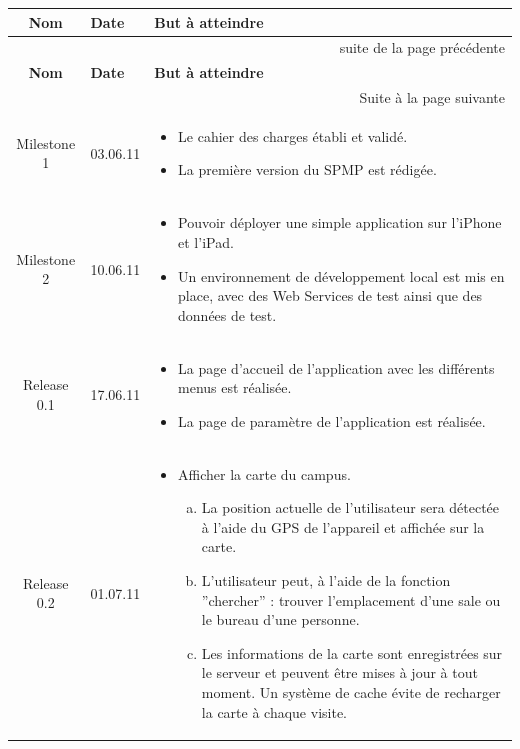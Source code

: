 \begin{longtable}{|c|l|p{10cm}|}
		 \hline  \textbf{Nom} & \textbf{Date}  & \textbf{But à atteindre}  \\ 
		 \endfirsthead
		  \multicolumn{3}{|r|}{{suite de la page précédente}} \\ \hline
		\hline  \textbf{Nom} & \textbf{Date}  & \textbf{But à atteindre}  \\ 
		 \endhead
		  \multicolumn{3}{|r|}{{Suite à la page suivante}} \\ \hline
		 \endfoot
		 \endlastfoot
		 \hline  Milestone 1 & 03.06.11  & 
		 	\begin{itemize}
		 	 		\item Le cahier des charges établi et validé.
		 			\item La première version du \gls{SPMP} est rédigée.
		 	\end{itemize}   \\ 
		 \hline  Milestone 2 & 10.06.11  & 
		 	\begin{itemize}
		 	 		\item Pouvoir déployer une simple application sur l'iPhone et l'iPad.
		 			\item Un environnement de développement local est mis en place, avec des Web Services de test ainsi que des données de test.
		 	\end{itemize}   \\ 
	 	 \hline  Release 0.1 & 17.06.11  & 
		 	\begin{itemize}
		 	 		\item La page d'accueil de l'application avec les différents menus est réalisée.
		 			\item La page de paramètre de l'application est réalisée.
		 	\end{itemize}   \\ 
	 	 \hline  Release 0.2 & 01.07.11  & 
		 	\begin{itemize}
		 	 		\item Afficher la carte du campus.
		 	 		\begin{enumerate}[a)]
	 	 				\item La position actuelle de l'utilisateur sera détectée à l'aide du \gls{GPS} de l'appareil et affichée sur la carte.
	 	 				\item L'utilisateur peut, à l'aide de la fonction ''chercher'' : trouver l'emplacement d'une sale ou le bureau d'une personne.
	 	 				\item Les informations de la carte sont enregistrées sur le serveur et peuvent être mises à jour à tout moment. Un système de cache évite de recharger la carte à chaque visite.

\end{enumerate}
\end{itemize}
\end{longtable}
